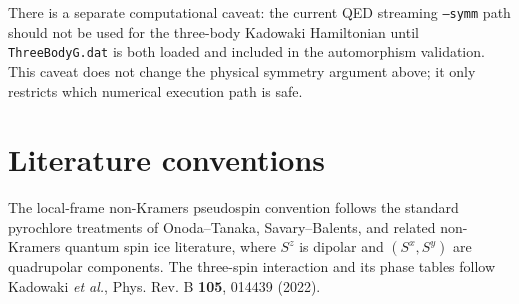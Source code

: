 \documentclass[11pt]{article}
\begin{document}
There is a separate computational caveat: the current QED streaming
\texttt{--symm} path should not be used for the three-body Kadowaki
Hamiltonian until \texttt{ThreeBodyG.dat} is both loaded and included in the
automorphism validation.  This caveat does not change the physical symmetry
argument above; it only restricts which numerical execution path is safe.

\section*{Literature conventions}

The local-frame non-Kramers pseudospin convention follows the standard
pyrochlore treatments of Onoda--Tanaka, Savary--Balents, and related
non-Kramers quantum spin ice literature, where $S^z$ is dipolar and
$(S^x,S^y)$ are quadrupolar components.  The three-spin interaction and its
phase tables follow Kadowaki \emph{et al.}, Phys. Rev. B \textbf{105},
014439 (2022).
\end{document}
